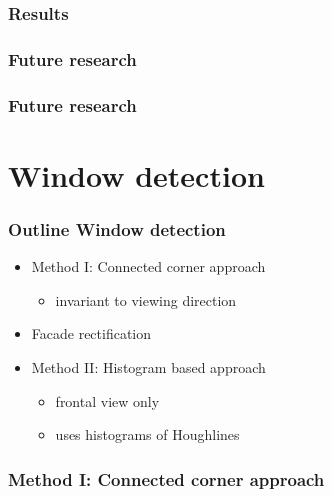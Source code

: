 \documentclass{beamer}
\begin{document}
\frame
{
	\frametitle{Results}
}


\frame
{
	\frametitle{Future research}
}

\frame
{
	\frametitle{Future research}
}


\section{Window detection}
\frame
{
}

\frame
{
	\frametitle{Outline Window detection}
	\begin{itemize}
	\item Method I: Connected corner approach 
		\begin{itemize}
		\item invariant to viewing direction
		\end{itemize}
	\item Facade rectification 
	\item Method II: Histogram based approach
		\begin{itemize}
		\item frontal view only
		\item uses histograms of Houghlines
		\end{itemize}
	\end{itemize}
}

\frame
{
	\frametitle{Method I: Connected corner approach}
}
\end{document}
